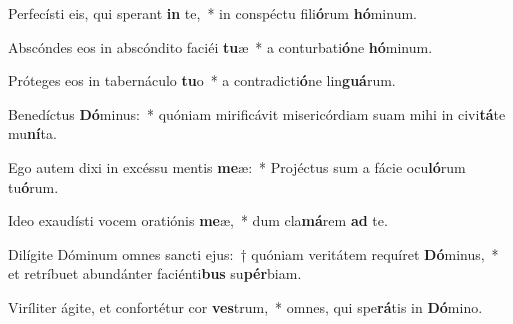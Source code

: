 \item Perfecísti eis, qui sperant \textbf{in} te,~* in conspéctu fili\textbf{ó}rum \textbf{hó}minum.
\item Abscóndes eos in abscóndito faciéi \textbf{tu}æ~* a conturbati\textbf{ó}ne \textbf{hó}minum.
\item Próteges eos in tabernáculo \textbf{tu}o~* a contradicti\textbf{ó}ne lin\textbf{guá}rum.
\item Benedíctus \textbf{Dó}minus:~* quóniam mirificávit misericórdiam suam mihi in civi\textbf{tá}te mu\textbf{ní}ta.
\item Ego autem dixi in excéssu mentis \textbf{me}æ:~* Projéctus sum a fácie ocu\textbf{ló}rum tu\textbf{ó}rum.
\item Ideo exaudísti vocem oratiónis \textbf{me}æ,~* dum cla\textbf{má}rem \textbf{ad} te.
\item Dilígite Dóminum omnes sancti ejus:~† quóniam veritátem requíret \textbf{Dó}minus,~* et retríbuet abundánter faciénti\textbf{bus} su\textbf{pér}biam.
\item Viríliter ágite, et confortétur cor \textbf{ves}trum,~* omnes, qui spe\textbf{rá}tis in \textbf{Dó}mino.
